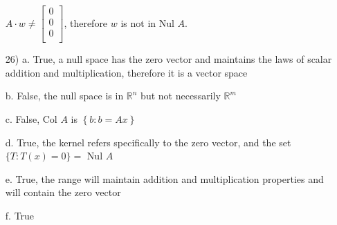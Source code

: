 \documentclass{article}
\begin{document}
\begin{enumerate}
      $A\cdot w \neq \begin{bmatrix*}0\\0\\0\\\end{bmatrix*}$,
      therefore $w$ is not in Nul $A$.
    \item[26)] 
      a. True, a null space has the zero vector and 
      maintains the laws of scalar addition and multiplication,
      therefore it is a vector space

      b. False, the null space is in $\mathbb{R}^n$ but not 
      necessarily $\mathbb{R}^m$

      c. False, Col $A$ is $\left\{b : b=Ax\right\}$

      d. True, the kernel refers specifically to the zero 
      vector, and the set $\{T:T(x)=0\}=$ Nul $A$

      e. True, the range will maintain addition and multiplication
      properties and will contain the zero vector

      f. True

  \end{enumerate}
\end{document}
